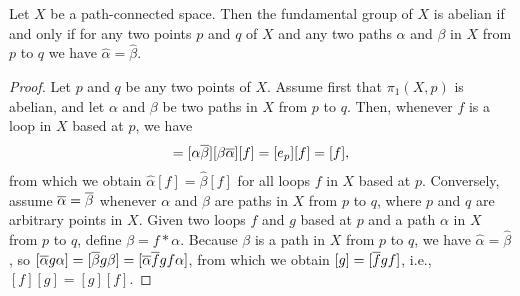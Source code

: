 \begin{prop}
    Let $X$ be a path-connected space.
    Then the fundamental group of $X$ is abelian if and only if for any two points $p$ and $q$ of $X$ and any two paths $\alpha$ and $\beta$ in $X$ from $p$ to $q$ we have $\widehat\alpha=\widehat\beta$.
\end{prop}
\begin{proof}
    Let $p$ and $q$ be any two points of $X$.
    Assume first that $\pi_1(X, p)$ is abelian, and let $\alpha$ and $\beta$ be two paths in $X$ from $p$ to $q$.
    Then, whenever $f$ is a loop in $X$ based at $p$, we have
    \begin{align*}
        [\alpha \ol\beta][f][\beta \ol\alpha]=[\alpha \ol\beta][\beta \ol\alpha][f]=[e_p][f]=[f],
    \end{align*}
    from which we obtain $\widehat\alpha[f]=\widehat\beta[f]$ for all loops $f$ in $X$ based at $p$.
    Conversely, assume $\overline{\alpha}=\overline{\beta}$ whenever $\alpha$ and $\beta$ are paths in $X$ from $p$ to $q$, where $p$ and $q$ are arbitrary points in $X$.
    Given two loops $f$ and $g$ based at $p$ and a path $\alpha$ in $X$ from $p$ to $q$, define $\beta=f*\alpha$.
    Because $\beta$ is a path in $X$ from $p$ to $q$, we have $\widehat\alpha=\widehat\beta$, so $[\overline{\alpha} g \alpha]=[\overline{\beta} g \beta]=[\overline{\alpha} \overline{f} g f \alpha]$, from which we obtain $[g]=[\overline{f} g f]$, i.e., $[f][g]=[g][f]$.
\end{proof}